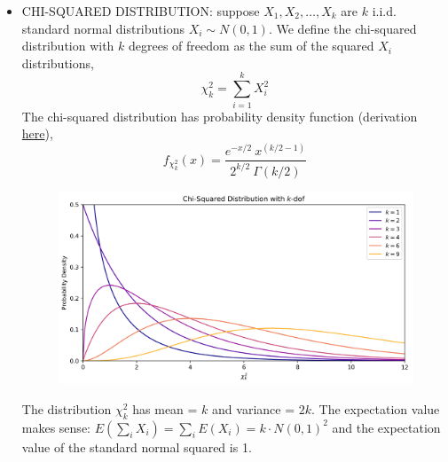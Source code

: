 \documentclass[12pt]{article}
\numberwithin{equation}{section}
\begin{document}
\begin{itemize}
\item CHI-SQUARED DISTRIBUTION: suppose $X_1, X_2, \dots, X_k$ are $k$ i.i.d. standard normal distributions $X_i\sim N(0,1)$. We define the chi-squared distribution with $k$ degrees of freedom as the sum of the squared $X_i$ distributions,
\begin{equation}
	\chi^2_k = \sum_{i=1}^{k} X_i^2
\end{equation}
The chi-squared distribution has probability density function (derivation \href{https://www.ocf.berkeley.edu/~yizhu/static/notes/Chi%20Squared/chi_squared.pdf}{here}),
\begin{equation}
	f_{\chi^2_k}(x) = \frac{e^{-x/2}\ x^{(k/2-1)}}{2^{k/2}\ \Gamma(k/2)} 
\end{equation}
\begin{figure}[H]
	\centering
	\includegraphics[width=12cm] {pdf}
\end{figure}

The distribution $ \chi^2_k $ has mean = $ k $ and variance = $ 2k $. The expectation value makes sense: $ E(\sum_i X_i) = \sum_i E(X_i) = k\cdot N(0,1)^2$ and the expectation value of the standard normal squared is 1.


\end{itemize}
\end{document}
